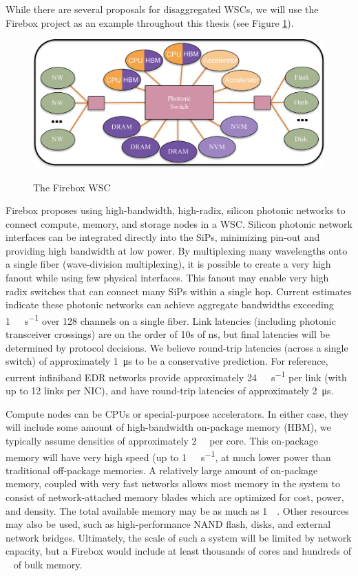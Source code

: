 While there are several proposals for disaggregated WSCs, we will use the
Firebox\cite{firebox} project as an example throughout this thesis (see Figure
\ref{fig:fb_diagram}).

\begin{figure}
    \centering
    \includegraphics[width=0.9\columnwidth]{figs/FBDiagram.pdf} \label{fig:fb_diagram}
    \vspace{-5mm}
    \caption{The Firebox WSC}
\end{figure}

Firebox proposes using high-bandwidth, high-radix, silicon photonic networks to
connect compute, memory, and storage nodes in a WSC. Silicon photonic network
interfaces can be integrated directly into the SiPs, minimizing pin-out and
providing high bandwidth at low power. By multiplexing many wavelengths onto a
single fiber (wave-division multiplexing), it is possible to create a very high
fanout while using few physical interfaces. This fanout may enable very high
radix switches that can connect many SiPs within a single hop. Current
estimates indicate these photonic networks can achieve aggregate bandwidths
exceeding \SI{1}{\tera\bit\per\second} over 128 channels on a single
fiber\cite{naturePhotonic}\cite{Photonic09}. Link latencies (including photonic
transceiver crossings) are on the order of 10s of \si{\nano\second}, but final
latencies will be determined by protocol decisions. We believe round-trip
latencies (across a single switch) of approximately \SI{1}{\micro\second} to be
a conservative prediction. For reference, current infiniband EDR networks
provide approximately \SI{24}{\giga\bit\per\second} per link (with up to 12
links per NIC), and have round-trip latencies of approximately
\SI{2}{\micro\second}\cite{binnigNW}.

Compute nodes can be CPUs or special-purpose accelerators. In either case, they
will include some amount of high-bandwidth on-package memory (HBM), we
typically assume densities of approximately \SI{2}{\giga\byte} per core. This
on-package memory will have very high speed (up to
\SI{1}{\tera\byte\per\second}, at much lower power than traditional off-package
memories. A relatively large amount of on-package memory, coupled with very
fast networks allows most memory in the system to consist of network-attached memory
blades which are optimized for cost, power, and density. The total available
memory may be as much as \SI{1}{\peta\byte}. Other resources may also be used,
such as high-performance NAND flash, disks, and external network bridges.
Ultimately, the scale of such a system will be limited by network capacity, but
a Firebox would include at least thousands of cores and hundreds of
\si{\tera\byte} of bulk memory.

